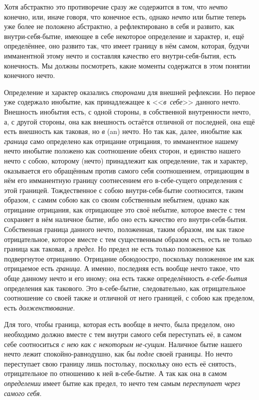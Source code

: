 \bigskip


Хотя абстрактно это противоречие сразу же содержится в том, что
{\em нечто} конечно, или, иначе говоря, что конечное
есть, однако {\em нечто} или бытие теперь уже более не
положено абстрактно, а рефлектировано в себя и развито, как
внутри-себя-бытие, имеющее в себе некоторое определение и характер, и, ещё
определённее, оно развито так, что имеет границу в нём самом, которая,
будучи имманентной этому нечто и составляя качество его внутри-себя-бытия,
есть конечность. Мы должны посмотреть, какие моменты содержатся в этом
понятии конечного нечто.

Определение и характер оказались {\em сторонами} для
внешней рефлексии. Но первое уже содержало инобытие, как принадлежащее к
<<{\em в~себе}>> данного нечто. Внешность инобытия есть,
с одной стороны, в собственной внутренности нечто, а, с другой стороны, она
как внешность остаётся отличной от последней, она ещё есть внешность как
таковая, но {\em в} (an) нечто. Но так как, далее,
инобытие как {\em граница} само определено как
отрицание отрицания, то имманентное нашему нечто инобытие положено как
соотношение обеих сторон, и единство нашего нечто с собою, которому (нечто)
принадлежит как определение, так и характер, оказывается его обращённым
против самого себя соотношением, отрицающим в нём его имманентную границу
соотнесением его в-себе-сущего определения с этой границей. Тождественное с
собою внутри-себя-бытие соотносится, таким образом, с самим собою как со
своим собственным небытием, однако как отрицание отрицания, как отрицающее
это своё небытие, которое вместе с тем сохраняет в нём наличное бытие, ибо
оно есть качество его внутри-себя-бытия. Собственная граница данного нечто,
положенная, таким образом, им как такое отрицательное, которое вместе с тем
существенным образом есть, есть не только граница как таковая, а
{\em предел}. Но предел не есть только положенное как
подвергнутое отрицанию. Отрицание обоюдоостро, поскольку положенное им как
отрицаемое есть {\em граница}. А именно, последняя есть
вообще нечто такое, что обще данному нечто и его иному; она есть также
определённость {\em в-себе-бытия} определения как
такового. Это в-себе-бытие, следовательно, как отрицательное соотношение со
своей также и отличной от него границей, с собою как пределом, есть
{\em долженствование}.

Для того, чтобы граница, которая есть вообще в нечто, была пределом, оно
необходимо должно вместе с тем внутри самого себя переступать её, в самом
себе соотноситься {\em с нею как с некоторым не-сущим}.
Наличное бытие нашего нечто лежит спокойно-равнодушно, как бы
{\em подле} своей границы. Но нечто переступает свою
границу лишь постольку, поскольку оно есть её снятость, отрицательное по
отношению к ней в-себе-бытие. А так как она в самом
{\em определении} имеет бытие как предел, то нечто тем
самым {\em переступает через самого себя}.

